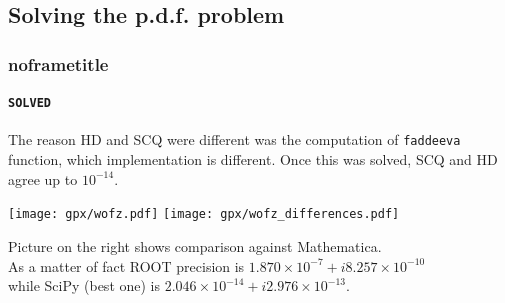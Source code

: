 \documentclass[aspectratio=43]{beamer}
\begin{document}
\subsection{Solving the p.d.f. problem}
\begin{frame}[default]
\frametitle{noframetitle}
\framesubtitle{ \texttt{\color{scqgreen}SOLVED} }

The reason HD and SCQ were different was the computation of \texttt{faddeeva}
function, which implementation is different. Once this was solved, SCQ and HD
agree up to $10^{-14}$.

\texttt{[image: gpx/wofz.pdf]}
\texttt{[image: gpx/wofz\_differences.pdf]}

Picture on the right shows comparison against Mathematica.\\

\vspace*{1cm}
\footnotesize
As a matter of fact
ROOT precision is
$1.870\times10^{-7} + i 8.257\times 10^{-10}$\\
while SciPy (best one) is
$2.046\times10^{-14} + i 2.976 \times10^{-13}$.

\end{frame}
\end{document}
